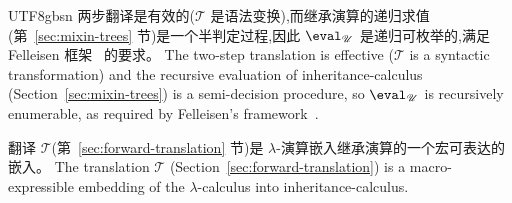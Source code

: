 \begin{CJK*}{UTF8}{gbsn}
\ifPaperChinese
两步翻译是有效的($\mathcal{T}$ 是语法变换),而继承演算的递归求值(第~\ref{sec:mixin-trees} 节)是一个半判定过程,因此 $\eval_{\mathscr{U}}$ 是递归可枚举的,满足 Felleisen 框架~\cite{felleisen1991-expressive-power} 的要求。
\else
The two-step translation is effective ($\mathcal{T}$
is a syntactic transformation) and the recursive evaluation
of inheritance-calculus (Section~\ref{sec:mixin-trees})
is a semi-decision procedure, so $\eval_{\mathscr{U}}$
is recursively enumerable, as required by
Felleisen's framework~\cite{felleisen1991-expressive-power}.
\fi

\begin{theorem}
  \label{thm:forward-macro}
  \ifPaperChinese
  翻译 $\mathcal{T}$(第~\ref{sec:forward-translation} 节)是 $\lambda$-演算嵌入继承演算的一个宏可表达的嵌入。
  \else
  The translation $\mathcal{T}$
  (Section~\ref{sec:forward-translation}) is a macro-expressible
  embedding of the $\lambda$-calculus into inheritance-calculus.
  \fi
\end{theorem}


\end{CJK*}
